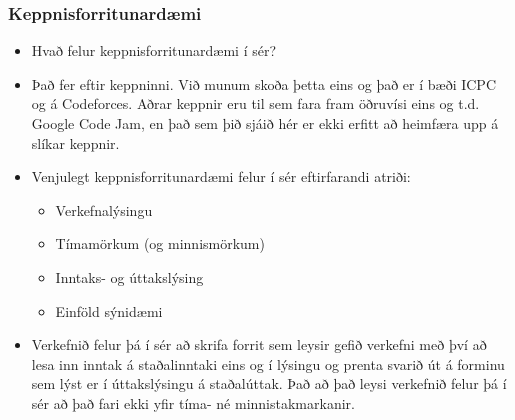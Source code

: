 \documentclass{beamer}
\begin{document}
\begin{frame}
\frametitle{Keppnisforritunardæmi}

\begin{itemize}

\item<1-> Hvað felur keppnisforritunardæmi í sér?

\item<2-> Það fer eftir keppninni. Við munum skoða þetta eins og það er í bæði ICPC og á Codeforces. Aðrar keppnir eru til sem fara fram öðruvísi eins og t.d. Google Code Jam, en það sem þið sjáið hér er ekki erfitt að heimfæra upp á slíkar keppnir.

\item<3-> Venjulegt keppnisforritunardæmi felur í sér eftirfarandi atriði:

\begin{itemize}

\item<4-> Verkefnalýsingu

\item<5-> Tímamörkum (og minnismörkum)

\item<6-> Inntaks- og úttakslýsing

\item<7-> Einföld sýnidæmi

\end{itemize}

\item<8-> Verkefnið felur þá í sér að skrifa forrit sem leysir gefið verkefni með því að lesa inn inntak á staðalinntaki eins og í lýsingu og prenta svarið út á forminu sem lýst er í úttakslýsingu á staðalúttak. Það að það leysi verkefnið felur þá í sér að það fari ekki yfir tíma- né minnistakmarkanir.

\end{itemize}

\end{frame}
\end{document}
